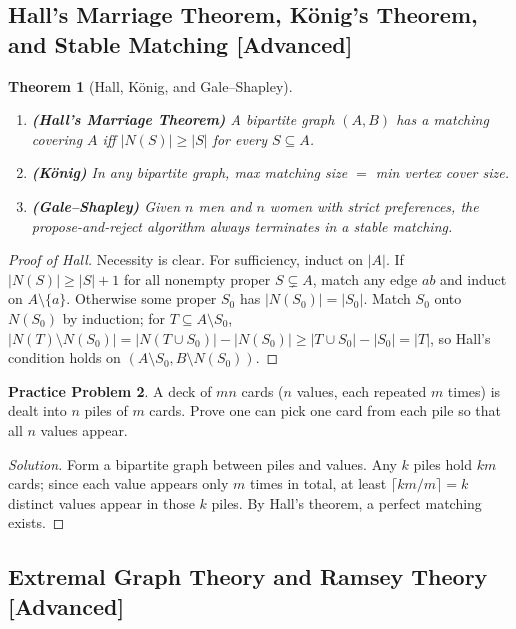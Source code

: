 \documentclass[11pt]{article}
\theoremstyle{plain}
\newtheorem{theorem}{Theorem}[section]
\theoremstyle{definition}
\newtheorem{problem}[theorem]{Practice Problem}
\newenvironment{solution}{\begin{proof}[Solution]}{\end{proof}}
\begin{document}
\subsection{Hall's Marriage Theorem, König's Theorem, and Stable Matching [Advanced]}

\begin{theorem}[Hall, König, and Gale--Shapley]
\leavevmode
\begin{enumerate}[label=(\alph*)]
\item \textbf{(Hall's Marriage Theorem)} A bipartite graph $(A, B)$ has a matching covering $A$ iff $|N(S)| \ge |S|$ for every $S \subseteq A$.
\item \textbf{(König)} In any bipartite graph, max matching size $=$ min vertex cover size.
\item \textbf{(Gale--Shapley)} Given $n$ men and $n$ women with strict preferences, the propose-and-reject algorithm always terminates in a stable matching.
\end{enumerate}
\end{theorem}
\begin{proof}[Proof of Hall]
Necessity is clear. For sufficiency, induct on $|A|$. If $|N(S)| \ge |S|+1$ for all nonempty proper $S \subsetneq A$, match any edge $ab$ and induct on $A\setminus\{a\}$. Otherwise some proper $S_0$ has $|N(S_0)| = |S_0|$. Match $S_0$ onto $N(S_0)$ by induction; for $T \subseteq A\setminus S_0$, $|N(T)\setminus N(S_0)| = |N(T\cup S_0)| - |N(S_0)| \ge |T\cup S_0| - |S_0| = |T|$, so Hall's condition holds on $(A\setminus S_0, B\setminus N(S_0))$.
\end{proof}

\begin{problem}
A deck of $mn$ cards ($n$ values, each repeated $m$ times) is dealt into $n$ piles of $m$ cards. Prove one can pick one card from each pile so that all $n$ values appear.
\end{problem}
\begin{solution}
Form a bipartite graph between piles and values. Any $k$ piles hold $km$ cards; since each value appears only $m$ times in total, at least $\lceil km/m \rceil = k$ distinct values appear in those $k$ piles. By Hall's theorem, a perfect matching exists.
\end{solution}

\subsection{Extremal Graph Theory and Ramsey Theory [Advanced]}
\end{document}

